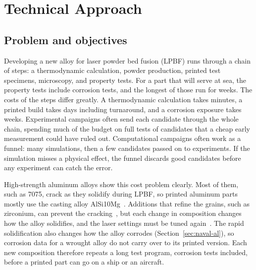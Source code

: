 \documentclass[12pt,letterpaper]{article}
\begin{document}
\setcounter{page}{2}
\setcounter{tocdepth}{2}
\tableofcontents
\clearpage


\section{Technical Approach}

\subsection{Problem and objectives}

Developing a new alloy for laser powder bed fusion (LPBF) runs through a chain
of steps: a thermodynamic calculation, powder production, printed test
specimens, microscopy, and property tests. For a part that will serve at sea,
the property tests include corrosion tests, and the longest of those run for
weeks. The costs of the steps differ greatly. A thermodynamic calculation
takes minutes, a printed build takes days including turnaround, and a
corrosion exposure takes weeks. Experimental campaigns often send each
candidate through the whole chain, spending much of the budget on full tests
of candidates that a cheap early measurement could have ruled out.
Computational campaigns often work as a funnel: many simulations, then a few
candidates passed on to experiments. If the simulation misses a physical
effect, the funnel discards good candidates before any experiment can catch
the error.

High-strength aluminum alloys show this cost problem clearly. Most of them,
such as 7075, crack as they solidify during LPBF, so printed aluminum parts
mostly use the casting alloy AlSi10Mg~\cite{martin2017}. Additions that refine
the grains, such as zirconium, can prevent the cracking~\cite{martin2017}, but
each change in composition changes how the alloy solidifies, and the laser
settings must be tuned again~\cite{debroy2018}. The rapid solidification also
changes how the alloy corrodes (Section~\ref{sec:naval-al}), so corrosion data
for a wrought alloy do not carry over to its printed version. Each new
composition therefore repeats a long test program, corrosion tests included,
before a printed part can go on a ship or an aircraft.
\end{document}
